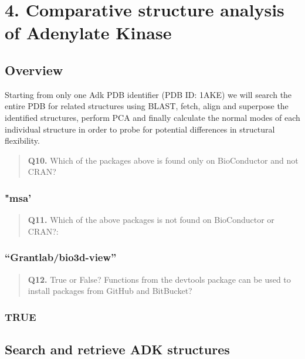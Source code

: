 \documentclass[
]{article}
\begin{document}
\hypertarget{comparative-structure-analysis-of-adenylate-kinase}{%
\section{4. Comparative structure analysis of Adenylate
Kinase}\label{comparative-structure-analysis-of-adenylate-kinase}}

\hypertarget{overview}{%
\subsection{Overview}\label{overview}}

Starting from only one Adk PDB identifier (PDB ID: 1AKE) we will search
the entire PDB for related structures using BLAST, fetch, align and
superpose the identified structures, perform PCA and finally calculate
the normal modes of each individual structure in order to probe for
potential differences in structural flexibility.

\begin{quote}
\textbf{Q10.} Which of the packages above is found only on BioConductor
and not CRAN?
\end{quote}

\hypertarget{msa}{%
\subsubsection{"msa'}\label{msa}}

\begin{quote}
\textbf{Q11.} Which of the above packages is not found on BioConductor
or CRAN?:
\end{quote}

\hypertarget{grantlabbio3d-view}{%
\subsubsection{``Grantlab/bio3d-view''}\label{grantlabbio3d-view}}

\begin{quote}
\textbf{Q12.} True or False? Functions from the devtools package can be
used to install packages from GitHub and BitBucket?
\end{quote}

\hypertarget{true}{%
\subsubsection{TRUE}\label{true}}

\hypertarget{search-and-retrieve-adk-structures}{%
\subsection{Search and retrieve ADK
structures}\label{search-and-retrieve-adk-structures}}
\end{document}
